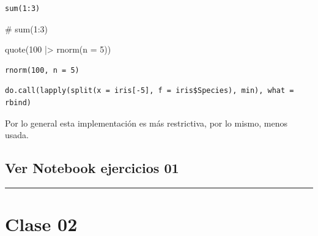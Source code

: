 \documentclass[
  letterpaper,
  DIV=11,
  numbers=noendperiod]{scrartcl}
\newenvironment{Shaded}{\begin{snugshade}}{\end{snugshade}}
\newcommand{\AttributeTok}[1]{\textcolor[rgb]{0.40,0.45,0.13}{#1}}
\newcommand{\CommentTok}[1]{\textcolor[rgb]{0.37,0.37,0.37}{#1}}
\newcommand{\DecValTok}[1]{\textcolor[rgb]{0.68,0.00,0.00}{#1}}
\newcommand{\FunctionTok}[1]{\textcolor[rgb]{0.28,0.35,0.67}{#1}}
\newcommand{\NormalTok}[1]{\textcolor[rgb]{0.00,0.23,0.31}{#1}}
\newcommand{\SpecialCharTok}[1]{\textcolor[rgb]{0.37,0.37,0.37}{#1}}
\begin{document}
\begin{verbatim}
sum(1:3)
\end{verbatim}

\begin{Shaded}
\begin{Highlighting}[]
\CommentTok{\# sum(1:3)}

\FunctionTok{quote}\NormalTok{(}\DecValTok{100} \SpecialCharTok{|\textgreater{}} \FunctionTok{rnorm}\NormalTok{(}\AttributeTok{n =} \DecValTok{5}\NormalTok{))}
\end{Highlighting}
\end{Shaded}

\begin{verbatim}
rnorm(100, n = 5)
\end{verbatim}

\begin{Shaded}
\end{Shaded}

\begin{verbatim}
do.call(lapply(split(x = iris[-5], f = iris$Species), min), what = rbind)
\end{verbatim}

Por lo general esta implementación es más restrictiva, por lo mismo,
menos usada.

\subsection{Ver Notebook ejercicios
01}\label{ver-notebook-ejercicios-01}

\par\rule{\textwidth}{0.5pt}

\newpage

\section{Clase 02}\label{clase-02}
\end{document}
